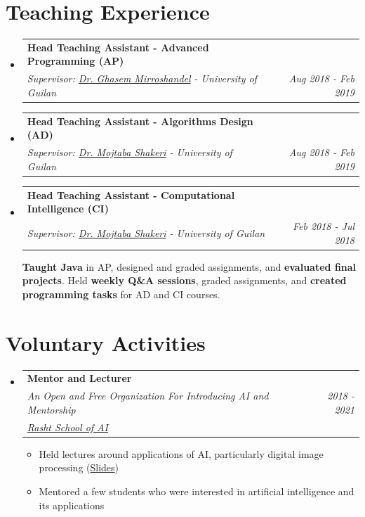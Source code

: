 \documentclass[letterpaper,11pt]{article}
\makeatletter
\newcommand{\resumeItem}[1]{
  \item\small{
    {#1 \vspace{0pt}}
  }
}
\newcommand{\resumeSubheading}[5]{
  \item
    \begin{tabular*}{0.97\textwidth}{l@{\extracolsep{\fill}}r}
      \textbf{#1} & #2 \\ 
      \textit{\small#3} & \textit{\small #4} \\
      \textit{#5} & 
    \end{tabular*}\vspace{-5pt}
}
\newcommand{\resumeSubheadingF}[4]{
  \item
    \begin{tabular*}{0.97\textwidth}{l@{\extracolsep{\fill}}r}
      \textbf{#1} & #2 \\ 
      \textit{\small#3} & \textit{\small #4} \\
    \end{tabular*}\vspace{-5pt}
}
\newcommand{\resumeSubHeadingListStart}{\begin{itemize}[leftmargin=*]}
\newcommand{\resumeSubHeadingListEnd}{\end{itemize}}
\newcommand{\resumeItemListStart}{\begin{itemize}}
\newcommand{\resumeItemListEnd}{\end{itemize}\vspace{-5pt}}
\makeatother
\begin{document}
\section{Teaching Experience}
  \resumeSubHeadingListStart
    \resumeSubheadingF
      {Head Teaching Assistant - Advanced Programming (AP)}{}
      {Supervisor: \href{https://ir.linkedin.com/in/seyed-abolghasem-mirroshandel-1a3a5950}{Dr. Ghasem Mirroshandel} - University of Guilan} 
      {Aug 2018 - Feb 2019}
  

    
    \resumeSubheadingF
      {Head Teaching Assistant - Algorithms Design (AD)}{}
      {Supervisor: \href{https://www.linkedin.com/in/mojtaba-moe-shakeri-b34a2b6/}{Dr. Mojtaba Shakeri} - University of Guilan} 
      {Aug 2018 - Feb 2019}
    
    \resumeSubheadingF
      {Head Teaching Assistant - Computational Intelligence (CI)}{}
      {Supervisor: \href{https://www.linkedin.com/in/mojtaba-moe-shakeri-b34a2b6/}{Dr. Mojtaba Shakeri} - University of Guilan}
      {Feb 2018 - Jul 2018}

    \vspace{10pt}
    \textbf{Taught Java} in AP, designed and graded assignments, and \textbf{evaluated final projects}. Held \textbf{weekly Q\&A sessions}, graded assignments, and \textbf{created programming tasks} for AD and CI courses.
    
  \resumeSubHeadingListEnd

\section{Voluntary Activities}
  \resumeSubHeadingListStart
    \resumeSubheading
      {Mentor and Lecturer}{}
      {An Open and Free Organization For Introducing AI and Mentorship} 
      {2018 - 2021}{\href{http://schoolofai.ir/}{Rasht School of AI}}
      \resumeItemListStart
        \resumeItem{Held lectures around applications of AI, particularly digital image processing (\href{https://github.com/rasht-school-of-ai/Meetup-Materials}{Slides})}
        \resumeItem{Mentored a few students who were interested in artificial intelligence and its applications}
      \resumeItemListEnd
  \resumeSubHeadingListEnd
\end{document}
